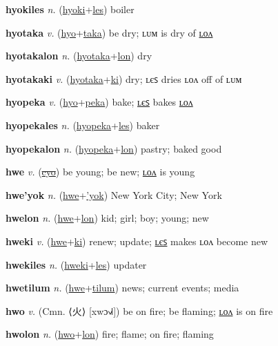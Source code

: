 \textbf{\hypertarget{hyokiles}{hyokiles}} \textit{n.} (\hyperlink{hyoki}{hyoki}+\allowbreak \hyperlink{les}{les})
boiler

\textbf{\hypertarget{hyotaka}{hyotaka}} \textit{v.} (\hyperlink{hyo}{hyo}+\allowbreak \hyperlink{taka}{taka})
be dry; ʟᴜᴍ is dry of \hyperlink{hyotakalon}{ʟᴏᴧ}

\textbf{\hypertarget{hyotakalon}{hyotakalon}} \textit{n.} (\hyperlink{hyotaka}{hyotaka}+\allowbreak \hyperlink{lon}{lon})
dry

\textbf{\hypertarget{hyotakaki}{hyotakaki}} \textit{v.} (\hyperlink{hyotaka}{hyotaka}+\allowbreak \hyperlink{ki}{ki})
dry; ʟєꜱ dries ʟᴏᴧ off of ʟᴜᴍ

\textbf{\hypertarget{hyopeka}{hyopeka}} \textit{v.} (\hyperlink{hyo}{hyo}+\allowbreak \hyperlink{peka}{peka})
bake; \hyperlink{hyopekales}{ʟєꜱ} bakes \hyperlink{hyopekalon}{ʟᴏᴧ}

\textbf{\hypertarget{hyopekales}{hyopekales}} \textit{n.} (\hyperlink{hyopeka}{hyopeka}+\allowbreak \hyperlink{les}{les})
baker

\textbf{\hypertarget{hyopekalon}{hyopekalon}} \textit{n.} (\hyperlink{hyopeka}{hyopeka}+\allowbreak \hyperlink{lon}{lon})
pastry; baked good

\textbf{\hypertarget{hwe}{hwe}} \textit{v.} (\hyperlink{cyo}{\sout{cyo}})
be young; be new; \hyperlink{hwelon}{ʟᴏᴧ} is young

\textbf{\hypertarget{hwe'yok}{hwe'yok}} \textit{n.} (\hyperlink{hwe}{hwe}+\allowbreak \hyperlink{'yok}{'yok})
New York City; New York

\textbf{\hypertarget{hwelon}{hwelon}} \textit{n.} (\hyperlink{hwe}{hwe}+\allowbreak \hyperlink{lon}{lon})
kid; girl; boy; young; new

\textbf{\hypertarget{hweki}{hweki}} \textit{v.} (\hyperlink{hwe}{hwe}+\allowbreak \hyperlink{ki}{ki})
renew; update; \hyperlink{hwekiles}{ʟєꜱ} makes ʟᴏᴧ become new

\textbf{\hypertarget{hwekiles}{hwekiles}} \textit{n.} (\hyperlink{hweki}{hweki}+\allowbreak \hyperlink{les}{les})
updater

\textbf{\hypertarget{hwetilum}{hwetilum}} \textit{n.} (\hyperlink{hwe}{hwe}+\allowbreak \hyperlink{tilum}{tilum})
news; current events; media

\textbf{\hypertarget{hwo}{hwo}} \textit{v.} (Cmn. ⟨{\chinese{}火}⟩ [xwɔ˧˩˧])
be on fire; be flaming; \hyperlink{hwolon}{ʟᴏᴧ} is on fire

\textbf{\hypertarget{hwolon}{hwolon}} \textit{n.} (\hyperlink{hwo}{hwo}+\allowbreak \hyperlink{lon}{lon})
fire; flame; on fire; flaming


